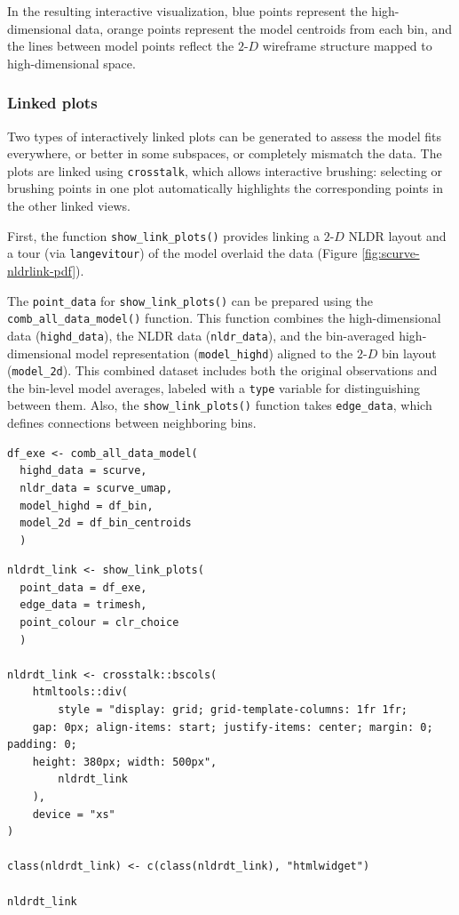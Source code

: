 In the resulting interactive visualization, blue points represent the high-dimensional data, orange points represent the model centroids from each bin, and the lines between model points reflect the \(2\text{-}D\) wireframe structure mapped to high-dimensional space.

\subsubsection{Linked plots}\label{linked-plots}

Two types of interactively linked plots can be generated to assess the model fits everywhere, or better in some subspaces, or completely mismatch the data. The plots are linked using \texttt{crosstalk}, which allows interactive brushing: selecting or brushing points in one plot automatically highlights the corresponding points in the other linked views.

First, the function \texttt{show\_link\_plots()} provides linking a \(2\text{-}D\) NLDR layout and a tour (via \texttt{langevitour}) of the model overlaid the data (Figure \ref{fig:scurve-nldrlink-pdf}).

The \texttt{point\_data} for \texttt{show\_link\_plots()} can be prepared using the \texttt{comb\_all\_data\_model()} function. This function combines the high-dimensional data (\texttt{highd\_data}), the NLDR data (\texttt{nldr\_data}), and the bin-averaged high-dimensional model representation (\texttt{model\_highd}) aligned to the \(2\text{-}D\) bin layout (\texttt{model\_2d}). This combined dataset includes both the original observations and the bin-level model averages, labeled with a \texttt{type} variable for distinguishing between them. Also, the \texttt{show\_link\_plots()} function takes \texttt{edge\_data}, which defines connections between neighboring bins.

\begin{verbatim}
df_exe <- comb_all_data_model(
  highd_data = scurve, 
  nldr_data = scurve_umap, 
  model_highd = df_bin, 
  model_2d = df_bin_centroids
  )
\end{verbatim}

\begin{verbatim}
nldrdt_link <- show_link_plots(
  point_data = df_exe, 
  edge_data = trimesh, 
  point_colour = clr_choice
  )

nldrdt_link <- crosstalk::bscols(
    htmltools::div(
        style = "display: grid; grid-template-columns: 1fr 1fr;
    gap: 0px; align-items: start; justify-items: center; margin: 0; padding: 0;
    height: 380px; width: 500px",
        nldrdt_link
    ),
    device = "xs"
)

class(nldrdt_link) <- c(class(nldrdt_link), "htmlwidget")

nldrdt_link
\end{verbatim}

